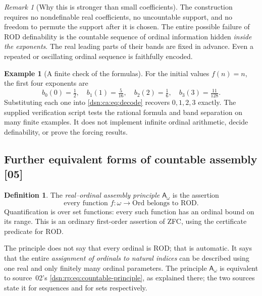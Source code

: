 \documentclass[11pt,a4paper]{article}
\numberwithin{equation}{section}
\theoremstyle{definition}
\newtheorem{definition}[definition]{Definition}
\newtheorem{example}[example]{Example}
\theoremstyle{remark}
\newtheorem{remark}[remark]{Remark}
\newcommand{\Ord}{\mathrm{Ord}}
\newcommand{\src}[1]{\textup{\textsf{\small[#1]}}}
\newcommand{\ROD}{\mathrm{ROD}}
\newcommand{\Asm}{\mathsf A_{\omega}}
\begin{document}
\begin{remark}[Why this is stronger than small coefficients]
The construction requires no nondefinable real coefficients, no
uncountable support, and no freedom to permute the support after it is
chosen. The entire possible failure of $\ROD$ definability is the
countable sequence of ordinal information hidden \emph{inside the
exponents}. The real leading parts of their bands are fixed in advance.
Even a repeated or oscillating ordinal sequence is faithfully encoded.
\end{remark}

\begin{example}[A finite check of the formulas]\label{dsn:ca:ex:finite}
For the initial values $f(n)=n$, the first four exponents are
\[
 b_0(0)=\tfrac12,\quad b_1(1)=\tfrac5{16},\quad
 b_2(2)=\tfrac16,\quad b_3(3)=\tfrac{11}{128}.
\]
Substituting each one into \eqref{dsn:ca:eq:decode} recovers $0,1,2,3$ exactly.
The supplied verification script tests the rational formula and band
separation on many finite examples. It does not implement infinite
ordinal arithmetic, decide definability, or prove the forcing results.
\end{example}

\subsection{Further equivalent forms of countable assembly \src{05}}
\label{dsn:ca:sec:assembly}

\begin{definition}
The \emph{real--ordinal assembly principle} $\Asm$ is the assertion
\[
 \text{every function }f:\omega\to\Ord\text{ belongs to }\ROD.
\]
Quantification is over set functions: every such function has an ordinal
bound on its range. This is an ordinary first-order assertion of ZFC,
using the certificate predicate for $\ROD$.
\end{definition}

The principle does not say that every ordinal is $\ROD$; that is automatic.
It says that the entire \emph{assignment of ordinals to natural indices}
can be described using one real and only finitely many ordinal parameters.
The principle $\Asm$ is equivalent to source~02's
\eqref{dsn:rp:eq:countable-principle}, as explained there; the two sources
state it for sequences and for sets respectively.
\end{document}
